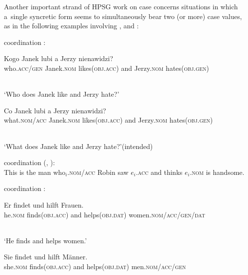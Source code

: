\documentclass[output=paper]{langsci/langscibook}
\begin{document}
Another important strand of HPSG work on case concerns situations in which a~single syncretic form seems to simultaneously bear two (or more) case values, as in the following examples involving ,  and :
\begin{examples}
\item\label{ex:syn:pc}  coordination \citep[701–702]{Dyla84}:
  \begin{examples}
  \item 
    \begin{gloss}
      Kogo Janek lubi a Jerzy nienawidzi? \\
      who.\textsc{acc/gen} Janek.\textsc{nom} likes(\textsc{obj.acc}) and Jerzy.\textsc{nom} hates(\textsc{obj.gen})
    \end{gloss}\\[\glosslen]
    ‘Who does Janek like and Jerzy hate?’
  \item 
    \begin{gloss}
      \prep{*}Co Janek lubi a Jerzy nienawidzi? \\
      what.\textsc{nom/acc} Janek.\textsc{nom} likes(\textsc{obj.acc}) and Jerzy.\textsc{nom} hates(\textsc{obj.gen})
    \end{gloss}\\[\glosslen]
    ‘What does Janek like and Jerzy hate?’\hfill(intended)
  \end{examples}
\item\label{ex:syn:ec}  coordination (\citealt[70]{Goodall87a-u}, \citealt[206]{LHC2001a-u}): \\ [1ex]
  This is the man who$_i$.\textsc{nom/acc} Robin saw $e_i$.\textsc{acc} and thinks $e_i$.\textsc{nom} is handsome.
\item\label{ex:syn:gc}  coordination \citep[764–765]{PZ86}:
  \begin{examples}
  \item
    \begin{gloss}
      Er findet und hilft Frauen. \\
      he.\textsc{nom} finds(\textsc{obj.acc}) and helps(\textsc{obj.dat}) women.\textsc{nom/acc/gen/dat}
    \end{gloss}\\[\glosslen]
    ‘He finds and helps women.’
  \item
    \begin{gloss}
      \prep{*}Sie findet und hilft Männer. \\
      she.\textsc{nom} finds(\textsc{obj.acc}) and helps(\textsc{obj.dat}) men.\textsc{nom/acc/gen}

\end{gloss}
\end{examples}
\end{examples}
\end{document}
